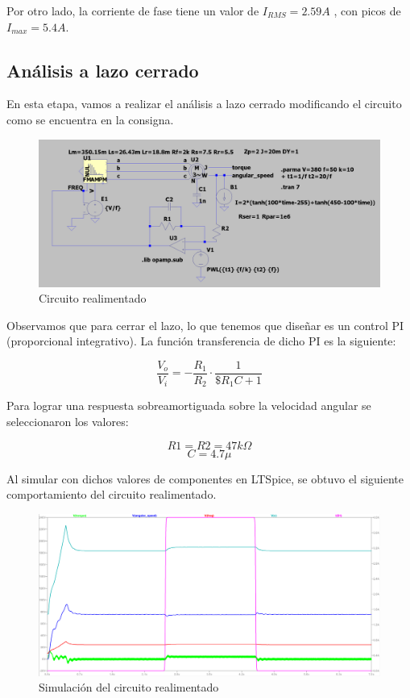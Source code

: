 \documentclass[e4_tp3_main.tex]{subfiles}
\begin{document}
Por otro lado, la corriente de fase tiene un valor de $I_{RMS}=2.59A$ , con picos de $I_{max}=5.4A$. 

\subsection{Análisis a lazo cerrado}
En esta etapa, vamos a realizar el análisis a lazo cerrado modificando el circuito como se encuentra en la consigna.

\begin{figure}[H]
	\centering
	\includegraphics[width=0.7\linewidth]{Imagenes/3-2-circuito.png}
	\caption{Circuito realimentado}
	\label{fig:torq}
\end{figure}

Observamos que para cerrar el lazo, lo que tenemos que diseñar es un control PI (proporcional integrativo). La función transferencia de dicho PI es la siguiente:

$$\frac{V_o}{V_i}=-\frac{R_1}{R_2} \cdot \frac{1}{\$ R_1 C + 1} $$

Para lograr una respuesta sobreamortiguada sobre la velocidad angular se seleccionaron los valores:

 $$R1=R2=47k \Omega$$  
 $$C=4.7\mu$$

\vspace{5cm}
Al simular con dichos valores de componentes en LTSpice, se obtuvo el siguiente comportamiento del circuito realimentado. 

\begin{figure}[H]
	\centering
	\includegraphics[width=0.8\linewidth]{Imagenes/3-2-subamortiguado.png}
	\caption{Simulación del circuito realimentado}
	\label{fig:torq}
\end{figure}
\end{document}
